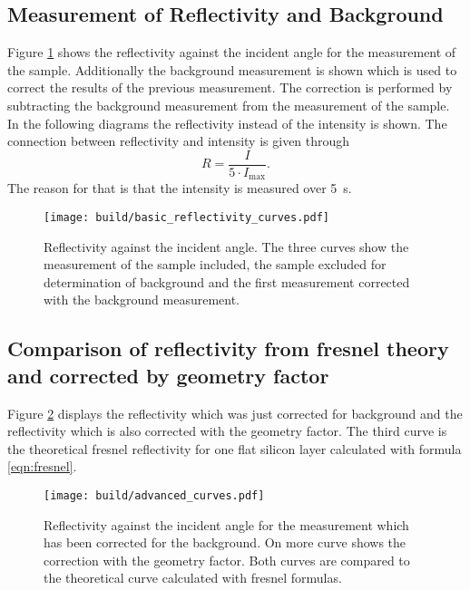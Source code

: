 \subsection{Measurement of Reflectivity and Background}
Figure \ref{fig:basic_measurement} shows the reflectivity against the incident angle for the measurement of the sample.
Additionally the background measurement is shown which is used to correct the results of the previous measurement.
The correction is performed by subtracting the background measurement from the measurement of the sample.
In the following diagrams the reflectivity instead of the intensity is shown. 
The connection between reflectivity and intensity is given through
\begin{equation}
  R=\frac{I}{5\cdot I_\text{max}}.
\end{equation}
The reason for that is that the intensity is measured over \qty{5}{\second}.

\begin{figure}[H]
  \centering
  \texttt{[image: build/basic\_reflectivity\_curves.pdf]}
  \caption{Reflectivity against the incident angle. The three curves show the measurement of the sample 
  included, the sample excluded for determination of background and the first measurement corrected with the 
  background measurement.}
  \label{fig:basic_measurement}
\end{figure}


\subsection{Comparison of reflectivity from fresnel theory and corrected by geometry factor}
Figure \ref{fig:advanced_curves} displays the reflectivity which was just corrected for background and the reflectivity which is also corrected with the geometry factor.%
The third curve is the theoretical fresnel reflectivity for one flat silicon layer calculated with formula \eqref{eqn:fresnel}. 
\begin{figure}[H]
  \centering
  \texttt{[image: build/advanced\_curves.pdf]}
  \caption{Reflectivity against the incident angle for the measurement which has been corrected for the background. On more curve shows the correction with the geometry factor. Both curves are compared to the theoretical curve calculated with fresnel formulas.}
  \label{fig:advanced_curves}
\end{figure}


